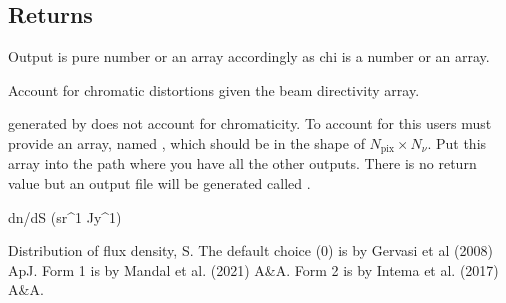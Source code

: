 \documentclass[letterpaper,10pt,english]{sphinxmanual}
\begin{document}
\begin{fulllineitems}
\begin{fulllineitems}
\begin{description}
\end{description}


\subsection{Returns}
\label{\detokenize{api:returns}}\begin{description}
\sphinxAtStartPar
Output is pure number or an array accordingly as chi is a number or an array.

\end{description}

\end{fulllineitems}


\begin{fulllineitems}
\label{\detokenize{api:furs.furs.chromatisize}}
\pysigstartsignatures
{}
\pysigstopsignatures
\sphinxAtStartPar
Account for chromatic distortions given the beam directivity array.

\sphinxAtStartPar
{} generated by  does not account for chromaticity. To account for this users must
provide an array, named , which should be in the shape of \(N_{\mathrm{pix}} \times N_{\nu}\).
Put this array into the path where you have all the other outputs. There is no return value but an output file
will be generated called .

\end{fulllineitems}


\begin{fulllineitems}
\label{\detokenize{api:furs.furs.dndS}}
\pysigstartsignatures
{}
\pysigstopsignatures
\sphinxAtStartPar
dn/dS (sr\textasciicircum{}\sphinxhyphen{}1 Jy\textasciicircum{}\sphinxhyphen{}1)

\sphinxAtStartPar
Distribution of flux density, S. The default choice (0) is by Gervasi et al (2008) ApJ.
Form 1 is by Mandal et al. (2021) A\&A.
Form 2 is by Intema et al. (2017) A\&A.



\end{fulllineitems}
\end{fulllineitems}
\end{document}
